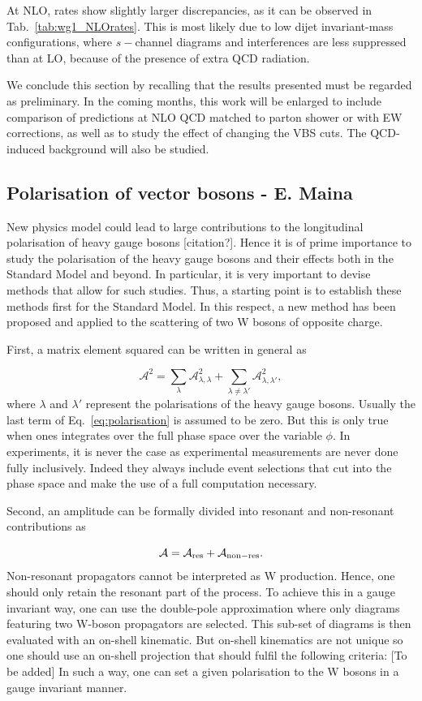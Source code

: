 At NLO, rates show slightly larger discrepancies, as it can be observed in Tab.~\ref{tab:wg1_NLOrates}. This is most likely due to low dijet invariant-mass configurations, where
$s-$channel diagrams and interferences are less suppressed than at LO, because of the presence of extra QCD radiation.

We conclude this section by recalling that the results presented must be regarded as preliminary.
In the coming months, this work will be enlarged to include comparison of predictions at NLO QCD matched to parton shower or with EW corrections, 
as well as to study the effect of changing 
the VBS cuts. The QCD-induced background will also be studied.

\subsection{Polarisation of vector bosons - E. Maina}

New physics model could lead to large contributions to the longitudinal polarisation of heavy gauge bosons [citation?].
Hence it is of prime importance to study the polarisation of the heavy gauge bosons and their effects both in the Standard Model and beyond.
In particular, it is very important to devise methods that allow for such studies.
Thus, a starting point is to establish these methods first for the Standard Model.
In this respect, a new method has been proposed and applied to the scattering of two W bosons of opposite charge.

First, a matrix element squared can be written in general as

\begin{equation}
\label{eq:polarisation}
 \mathcal{A}^2 = \sum_{\lambda} \mathcal{A}^2_{\lambda, \lambda} + \sum_{\lambda \neq \lambda'} \mathcal{A}^2_{\lambda, \lambda'}, 
\end{equation}
%
where $\lambda$ and $\lambda'$ represent the polarisations of the heavy gauge bosons.
Usually the last term of Eq.~\eqref{eq:polarisation} is assumed to be zero.
But this is only true when ones integrates over the full phase space over the variable $\phi$.
In experiments, it is never the case as experimental measurements are never done fully inclusively.
Indeed they always include event selections that cut into the phase space and make the use of a full computation necessary.

Second, an amplitude can be formally divided into resonant and non-resonant contributions as

\begin{equation}
\mathcal{A} = \mathcal{A}_{\rm res} + \mathcal{A}_{\rm non-res} .
\end{equation}
%
Non-resonant propagators cannot be interpreted as W production.
Hence, one should only retain the resonant part of the process.
To achieve this in a gauge invariant way, one can use the double-pole approximation where only diagrams featuring two W-boson propagators are selected.
This sub-set of diagrams is then evaluated with an on-shell kinematic.
But on-shell kinematics are not unique so one should use an on-shell projection that should fulfil the following criteria:
[To be added]
In such a way, one can set a given polarisation to the W bosons in a gauge invariant manner.

